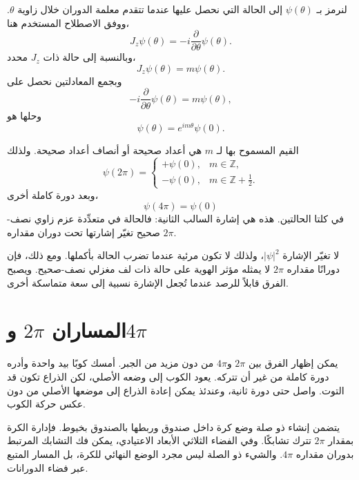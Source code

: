 لنرمز بـ \(\psi(\theta)\) إلى الحالة التي نحصل عليها عندما تتقدم معلمة الدوران خلال زاوية \(\theta\). ووفق الاصطلاح المستخدم هنا،
\begin{equation}
J_z\psi(\theta)
=
-i\frac{\partial}{\partial\theta}\psi(\theta).
\end{equation}
وبالنسبة إلى حالة ذات \(J_z\) محدد،
\begin{equation}
J_z\psi(\theta)=m\psi(\theta).
\end{equation}
وبجمع المعادلتين نحصل على
\begin{equation}
-i\frac{\partial}{\partial\theta}\psi(\theta)
=
m\psi(\theta),
\end{equation}
وحلها هو
\begin{equation}
\psi(\theta)=e^{im\theta}\psi(0).
\end{equation}

القيم المسموح بها لـ \(m\) هي أعداد صحيحة أو أنصاف أعداد صحيحة. ولذلك
\begin{equation}
\psi(2\pi)
=
\begin{cases}
+\psi(0), & m\in\mathbb Z,\\[4pt]
-\psi(0), & m\in\mathbb Z+\tfrac12.
\end{cases}
\end{equation}
وبعد دورة كاملة أخرى،
\begin{equation}
\psi(4\pi)=\psi(0)
\end{equation}
في كلتا الحالتين. هذه هي إشارة السالب الثانية: فالحالة في متعدِّدة عزم زاوي نصف-صحيح تغيّر إشارتها تحت دوران مقداره \(2\pi\).

لا تغيّر الإشارة \(\lvert\psi\rvert^2\)، ولذلك لا تكون مرئية عندما تضرب الحالة بأكملها. ومع ذلك، فإن دورانًا مقداره \(2\pi\) لا يمثله مؤثر الهوية على حالة ذات لف مغزلي نصف-صحيح. ويصبح الفرق قابلاً للرصد عندما تُجعل الإشارة نسبية إلى سعة متماسكة أخرى.

\section{المساران \texorpdfstring{\(2\pi\) و\(4\pi\)}{2 pi و4 pi}}

يمكن إظهار الفرق بين \(2\pi\) و\(4\pi\) من دون مزيد من الجبر. أمسك كوبًا بيد واحدة وأدره دورة كاملة من غير أن تتركه. يعود الكوب إلى وضعه الأصلي، لكن الذراع تكون قد التوت. واصل حتى دورة ثانية، وعندئذ يمكن إعادة الذراع إلى موضعها الأصلي من دون عكس حركة الكوب.

يتضمن إنشاء ذو صلة وضع كرة داخل صندوق وربطها بالصندوق بخيوط. فإدارة الكرة بمقدار \(2\pi\) تترك تشابكًا. وفي الفضاء الثلاثي الأبعاد الاعتيادي، يمكن فك التشابك المرتبط بدوران مقداره \(4\pi\). والشيء ذو الصلة ليس مجرد الوضع النهائي للكرة، بل المسار المتبع عبر فضاء الدورانات.

